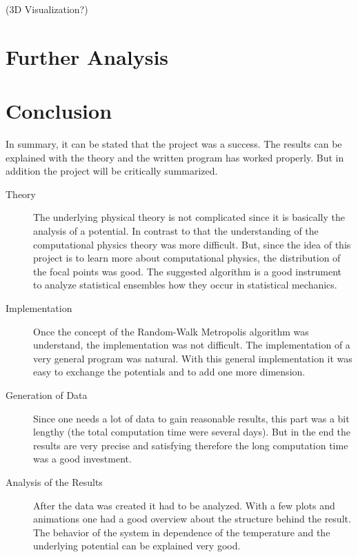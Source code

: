\documentclass[11pt, a4paper]{article}
\numberwithin{equation}{section}
\newcommand{\remark}[1]{{\color{red}(#1)}}
\begin{document}
\begin{figure}[!h]
\begin{subfigure}[t]{0.48\textwidth}
	\end{subfigure}

\end{figure}


\remark{3D Visualization?}
\section{Further Analysis} \label{sec:Further_Analysis}


\section{Conclusion}

In summary, it can be stated that the project was a success.
The results can be explained with the theory and the written program has worked properly.
But in addition the project will be critically summarized.

\begin{description}
\item[Theory]
The underlying physical theory is not complicated since it is basically the analysis of a potential.
In contrast to that the understanding of the computational physics theory was more difficult.
But, since the idea of this project is to learn more about computational physics, the distribution of the focal points was good.
The suggested algorithm is a good instrument to analyze statistical ensembles how they occur in statistical mechanics.

\item[Implementation]
Once the concept of the Random-Walk Metropolis algorithm was understand, the implementation was not difficult.
The implementation of a very general program was natural.
With this general implementation it was easy to exchange the potentials and to add one more dimension.

\item[Generation of Data]
Since one needs a lot of data to gain reasonable results, this part was a bit lengthy (the total computation time were several days).
But in the end the results are very precise and satisfying therefore the long computation time was a good investment.

\item[Analysis of the Results]
After the data was created it had to be analyzed.
With a few plots and animations one had a good overview about the structure behind the result.
The behavior of the system in dependence of the temperature and the underlying potential can be explained very good.
\end{description}
\end{document}
